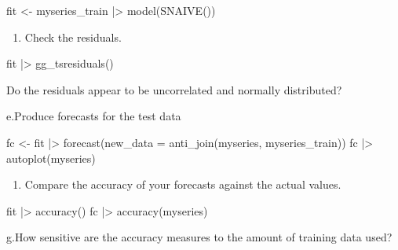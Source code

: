 \documentclass[
  11pt,
]{article}
\newenvironment{Shaded}{\begin{snugshade}}{\end{snugshade}}
\newcommand{\NormalTok}[1]{\textcolor[rgb]{0.00,0.23,0.31}{#1}}
\providecommand{\tightlist}{%
  \setlength{\itemsep}{0pt}\setlength{\parskip}{0pt}}\usepackage{longtable,booktabs,array}
\begin{document}
\begin{Shaded}
\begin{Highlighting}[]
\NormalTok{fit \textless{}{-} myseries\_train |\textgreater{}}
\NormalTok{  model(SNAIVE())}
\end{Highlighting}
\end{Shaded}

\begin{enumerate}
\def\labelenumi{\alph{enumi}.}
\setcounter{enumi}{3}
\tightlist
\item
  Check the residuals.
\end{enumerate}

\begin{Shaded}
\begin{Highlighting}[]
\NormalTok{fit |\textgreater{} gg\_tsresiduals()}
\end{Highlighting}
\end{Shaded}

Do the residuals appear to be uncorrelated and normally distributed?

e.Produce forecasts for the test data

\begin{Shaded}
\begin{Highlighting}[]
\NormalTok{fc \textless{}{-} fit |\textgreater{}}
\NormalTok{  forecast(new\_data = anti\_join(myseries, myseries\_train))}
\NormalTok{fc |\textgreater{} autoplot(myseries)}
\end{Highlighting}
\end{Shaded}

\begin{enumerate}
\def\labelenumi{\alph{enumi}.}
\setcounter{enumi}{5}
\tightlist
\item
  Compare the accuracy of your forecasts against the actual values.
\end{enumerate}

\begin{Shaded}
\begin{Highlighting}[]
\NormalTok{fit |\textgreater{} accuracy()}
\NormalTok{fc |\textgreater{} accuracy(myseries)}
\end{Highlighting}
\end{Shaded}

g.How sensitive are the accuracy measures to the amount of training data
used?
\end{document}
